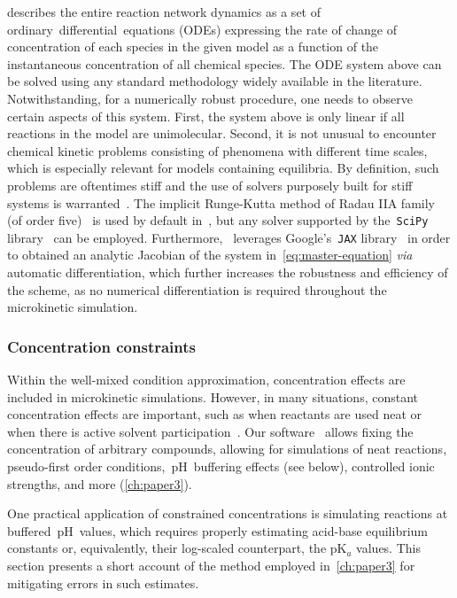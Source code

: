  describes the entire reaction network dynamics
as a set of ordinary~differential~equations (ODEs) expressing the rate of change of concentration of each species in the given model
as a function of the instantaneous concentration of all chemical species.
The ODE system above can be solved using any standard methodology widely available in the literature.
Notwithstanding,
for a numerically robust procedure,
one needs to observe certain aspects of this system.
First,
the system above is only linear if all reactions in the model are unimolecular.
Second,
it is not unusual to encounter chemical kinetic problems
consisting of
phenomena with different time scales,
which is especially relevant for models containing equilibria.
By definition,
such problems are oftentimes stiff and the use of solvers purposely built  for stiff systems is warranted~\cite{Curtiss_1952,Hairer_1991,Petzold_1983}.
The implicit Runge-Kutta method of Radau IIA family (of order five)~\cite{Hairer_1996} is used by default in~\overreact{},
but any solver supported by the~\texttt{SciPy} library~\cite{Virtanen_2020} can be employed.
Furthermore,
\overreact{}~leverages Google's~\texttt{JAX} library~\cite{jax2018github}
in order to
obtained an analytic Jacobian of the system in~\cref{eq:master-equation} \emph{via} automatic differentiation,
which further increases the robustness and efficiency of the scheme,
as no numerical differentiation is required throughout the microkinetic simulation.

\subsubsection{Concentration constraints}%
\label{sec:microkinetic-constraints}

Within the well-mixed condition approximation,
concentration effects are included in microkinetic simulations.
However,
in many situations,
constant concentration effects are important,
such as when reactants are used neat or when there is active solvent participation~\cite{Ryu_2018}.
Our software~\overreact{} allows fixing the concentration of arbitrary compounds,
allowing for simulations of neat reactions,
pseudo-first order conditions,~pH~buffering effects (see below),
controlled ionic strengths,
and more (\cref{ch:paper3}).

%
\label{sec:pka}

One practical application of constrained concentrations is simulating reactions at buffered~pH~values,
which requires properly estimating acid-base equilibrium constants or,
equivalently,
their log-scaled counterpart,
the pK$_a$ values.
This section presents a short account of the method employed in~\cref{ch:paper3} for mitigating errors in such estimates.

